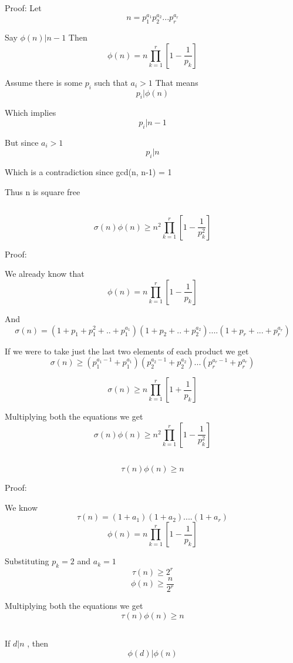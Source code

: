 \documentclass{article}
\begin{document}
Proof:
Let
\[
    n = p_1^{a_1} p_2^{a_2} . . . p_r^{a_r}
\]

Say \(\phi(n) \vert {n-1}\)
Then
\[
    \phi(n) = n \prod_{k=1}^{r} [1 - \frac{1}{p_k}]
\]

Assume there is some \(p_i\) such that \(a_i > 1\)
That means 
\[
    p_i \vert{\phi(n)}
\]

Which implies
\[
    p_i \vert n-1
\]

But since \(a_i > 1\)
\[
    p_i \vert n
\]

Which is a contradiction since gcd(n, n-1) = 1

Thus n is square free

\subsection{}
\[
    \sigma(n) \phi(n) \geq n^2 \prod_{k=1}^{r} [ 1 - \frac{1}{p_k^2}]
\]

Proof:

We already know that
\[
    \phi(n) = n \prod_{k=1}^r [1-\frac{1}{p_k}]
\]

And
\[
    \sigma(n) = ( 1 + p_1 + p_1^2 + . .+  p_1^{a_1}) ( 1 + p_2 + . . + p_2^{a_2}). .. . ( 1 + p_r + . . . + p_r^{a_r})
\]

If we were to take just the last two elements of each product we get
\[
    \sigma(n) \geq ( p_1^{a_1 - 1} + p_1^{a_1}) ( p_2^{a_2 -1}  + p_2^{a_2} )
    . . .  ( p_r^{a_r - 1} + p_r^{a_r} )
\]

\[
    \sigma(n) \geq n \prod_{k=1}^r [ 1 + \frac{1}{p_k}]
\]

Multiplying both the equations we get
\[
    \sigma(n) \phi(n) \geq n^2 \prod_{k=1}^{r} [ 1 - \frac{1}{p_k^2}]
\]

\subsection{}
\[
    \tau(n) \phi(n) \geq n
\]

Proof:

We know
\[
    \tau(n) = (1 + a_1)(1 + a_2). . . . (1 + a_r)
\]
\[
    \phi(n) = n \prod_{k=1}^r [1 - \frac{1}{p_k}]
\]

Substituting \(p_k = 2\) and \(a_k = 1\)
\[
    \tau(n) \geq 2^r
\]
\[
    \phi(n) \geq \frac{n}{2^r}
\]

Multiplying both the equations we get
\[
    \tau(n) \phi(n) \geq n
\]

\subsection{}
If \(d \vert n\) , then
\[
    \phi(d) \vert \phi(n)
\]
\end{document}

